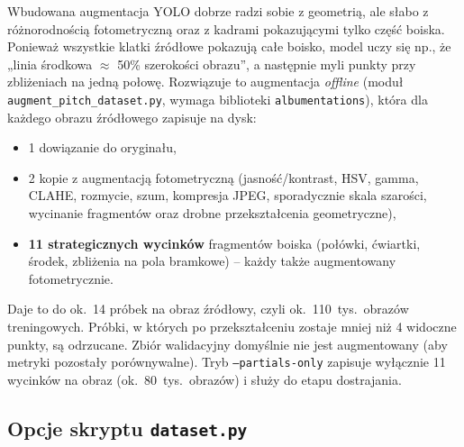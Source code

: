 \documentclass[11pt,a4paper]{article}
\begin{document}
Wbudowana augmentacja YOLO dobrze radzi sobie z geometrią, ale słabo z
różnorodnością fotometryczną oraz z kadrami pokazującymi tylko część boiska.
Ponieważ wszystkie klatki źródłowe pokazują całe boisko, model uczy się np.,
że „linia środkowa $\approx$ 50\% szerokości obrazu”, a następnie myli punkty
przy zbliżeniach na jedną połowę. Rozwiązuje to augmentacja \emph{offline}
(moduł \texttt{augment\_pitch\_dataset.py}, wymaga biblioteki
\texttt{albumentations}), która dla każdego obrazu źródłowego zapisuje na dysk:
\begin{itemize}[nosep]
  \item 1 dowiązanie do oryginału,
  \item 2 kopie z augmentacją fotometryczną (jasność/kontrast, HSV, gamma,
        CLAHE, rozmycie, szum, kompresja JPEG, sporadycznie skala szarości,
        wycinanie fragmentów oraz drobne przekształcenia geometryczne),
  \item \textbf{11 strategicznych wycinków} fragmentów boiska (połówki,
        ćwiartki, środek, zbliżenia na pola bramkowe) -- każdy także
        augmentowany fotometrycznie.
\end{itemize}
Daje to do ok.~14 próbek na obraz źródłowy, czyli ok.~110~tys.\ obrazów
treningowych. Próbki, w których po przekształceniu zostaje mniej niż 4 widoczne
punkty, są odrzucane. Zbiór walidacyjny domyślnie nie jest augmentowany (aby
metryki pozostały porównywalne). Tryb \texttt{--partials-only} zapisuje wyłącznie
11 wycinków na obraz (ok.~80~tys.\ obrazów) i służy do etapu dostrajania.

\subsection{Opcje skryptu \texttt{dataset.py}}
\end{document}
